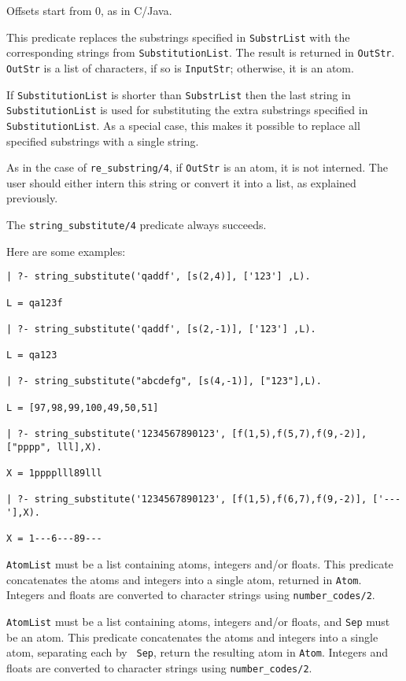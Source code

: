 \begin{description}
Offsets start from 0, as in C/Java.

This predicate replaces the substrings specified in {\tt SubstrList} with
the corresponding strings from {\tt SubstitutionList}.  The result is
returned in {\tt OutStr}. {\tt OutStr} is a list of characters, if so is
{\tt InputStr}; otherwise, it is an atom.

If {\tt SubstitutionList} is shorter than {\tt SubstrList} then the last
string in {\tt SubstitutionList} is used for substituting the extra
substrings specified in {\tt SubstitutionList}. As a special case, this
makes it possible to replace all specified substrings with a single string.

As in the case of {\tt re\_substring/4}, if {\tt OutStr} is an atom, it is
not interned.  The user should either intern this string or convert it into
a list, as explained previously.

The \verb|string_substitute/4| predicate always succeeds.

Here are some examples:
\begin{verbatim}
| ?- string_substitute('qaddf', [s(2,4)], ['123'] ,L).

L = qa123f

| ?- string_substitute('qaddf', [s(2,-1)], ['123'] ,L).

L = qa123

| ?- string_substitute("abcdefg", [s(4,-1)], ["123"],L).

L = [97,98,99,100,49,50,51]

| ?- string_substitute('1234567890123', [f(1,5),f(5,7),f(9,-2)], ["pppp", lll],X).

X = 1pppplll89lll

| ?- string_substitute('1234567890123', [f(1,5),f(6,7),f(9,-2)], ['---'],X).

X = 1---6---89---
\end{verbatim}


{\tt AtomList} must be a list containing atoms, integers and/or
floats.  This predicate concatenates the atoms and integers into a
single atom, returned in {\tt Atom}.  Integers and floats are
converted to character strings using {\tt number\_codes/2}.


{\tt AtomList} must be a list containing atoms, integers and/or
floats, and {\tt Sep} must be an atom.  This predicate concatenates
the atoms and integers into a single atom, separating each by {\tt
Sep}, return the resulting atom in {\tt Atom}.  Integers and floats
are converted to character strings using {\tt number\_codes/2}.


\end{description}
